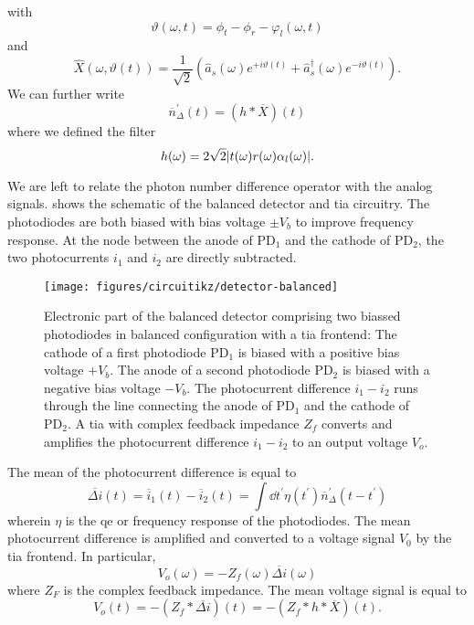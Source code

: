 with
\begin{equation}
	\vartheta(\omega,t)
	=
	\phi_t-\phi_r-\varphi_l(\omega,t)
\end{equation}
and
\begin{equation}
	\hat{X}\left(\omega,\vartheta(t)\right)
	=
	\frac{1}{\sqrt{2}}
	\left(
		\hat{a}_s(\omega)
		e^{+i\vartheta(t)}
		+
		\hat{a}_s^\dagger(\omega)
		e^{-i\vartheta(t)}
	\right)
	.
\end{equation}
We can further write
\begin{equation}
	\overline{n}^\prime_\Delta(t)
	=
	\left(h*\overline{X}\right)(t)
\end{equation}
where we defined the filter
\begin{equation}
	h(\omega)
	=
	2\sqrt{2}
	\lvert t(\omega)r(\omega)\alpha_l(\omega)\rvert
	.
\end{equation}

We are left to relate the photon number difference operator with the analog signals.
 shows the schematic of the balanced detector and \gls{tia} circuitry.
The photodiodes are both biased with bias voltage $\pm V_b$ to improve frequency response.
At the node between the anode of $\text{PD}_1$ and the cathode of $\text{PD}_2$, the two photocurrents $i_1$ and $i_2$ are directly subtracted.
\begin{figure}[htb]
    \centering
    \texttt{[image: figures/circuitikz/detector-balanced]}
    \caption{Electronic part of the balanced detector comprising two biassed photodiodes in balanced configuration with a \gls{tia} frontend: The cathode of a first photodiode $\text{PD}_1$ is biased with a positive bias voltage $+V_b$. The anode of a second photodiode $\text{PD}_2$ is biased with a negative bias voltage $-V_b$. The photocurrent difference $i_1-i_2$ runs through the line connecting the anode of $\text{PD}_1$ and the cathode of $\text{PD}_2$. A \gls{tia} with complex feedback impedance $Z_f$ converts and amplifies the photocurrent difference $i_1-i_2$ to an output voltage $V_o$.}\label{fig:balanced_detector_electronics}
\end{figure}
The mean of the photocurrent difference is equal to
\begin{equation}
	\overline{\Delta i}(t)
	=
	\overline{i}_1(t)
	-
	\overline{i}_2(t)
	=
	\int\dd{t^\prime}
	\eta(t^\prime)
	\overline{n}_\Delta^\prime(t-t^\prime)
\end{equation}
wherein $\eta$ is the \gls{qe} or frequency response of the photodiodes.
The mean photocurrent difference is amplified and converted to a voltage signal $V_0$ by the \gls{tia} frontend.
In particular,
\begin{equation}
	V_o(\omega)
	=
	-
	Z_f(\omega)
	\overline{\Delta i}(\omega)
\end{equation}
where $Z_F$ is the complex feedback impedance.
The mean voltage signal is equal to
\begin{equation}
	V_o(t)
	=
	-
	\left(Z_f*\overline{\Delta i}\right)(t)
	=
	-
	\left(Z_f*h*\overline{X}\right)(t)
	.
\end{equation}

